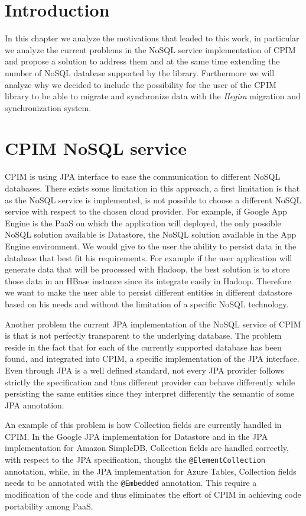 \section{Introduction}
In this chapter we analyze the motivations that leaded to this work, in particular we analyze the current problems in the NoSQL service implementation of CPIM and propose a solution to address them and at the same time extending the number of NoSQL database supported by the library.
\noindent Furthermore we will analyze why we decided to include the possibility for the user of the CPIM library to be able to migrate and synchronize data with the \textit{Hegira} migration and synchronization system.

\section{CPIM NoSQL service}
CPIM is using JPA interface to ease the communication to different NoSQL databases. There exists some limitation in this approach, a first limitation is that as the NoSQL service is implemented, is not possible to choose a different NoSQL service with respect to the chosen cloud provider. For example, if Google App Engine is the PaaS on which the application will deployed, the only possible NoSQL solution available is Datastore, the NoSQL solution available in the App Engine environment.
We would give to the user the ability to persist data in the database that best fit his requirements. For example if the user application will generate data that will be processed with Hadoop, the best solution is to store those data in an HBase instance since its integrate easily in Hadoop.
Therefore we want to make the user able to persist different entities in different datastore based on his needs and without the limitation of a specific NoSQL technology.

\newparagraph Another problem the current JPA implementation of the NoSQL service of CPIM is that is not perfectly transparent to the underlying database. The problem reside in the fact that for each of the currently supported database has been found, and integrated into CPIM, a specific implementation of the JPA interface. Even through JPA is a well defined standard, not every JPA provider follows strictly the specification and thus different provider can behave differently while persisting the same entities since they interpret differently the semantic of some JPA annotation.

\noindent An example of this problem is how Collection fields are currently handled in CPIM. In the Google JPA implementation for Datastore and in the JPA implementation for Amazon SimpleDB, Collection fields are handled correctly, with respect to the JPA specification, thought the \texttt{@ElementCollection} annotation, while, in the JPA implementation for Azure Tables, Collection fields needs to be annotated with the \texttt{@Embedded} annotation. This require a modification of the code and thus eliminates the effort of CPIM in achieving code portability among PaaS.

